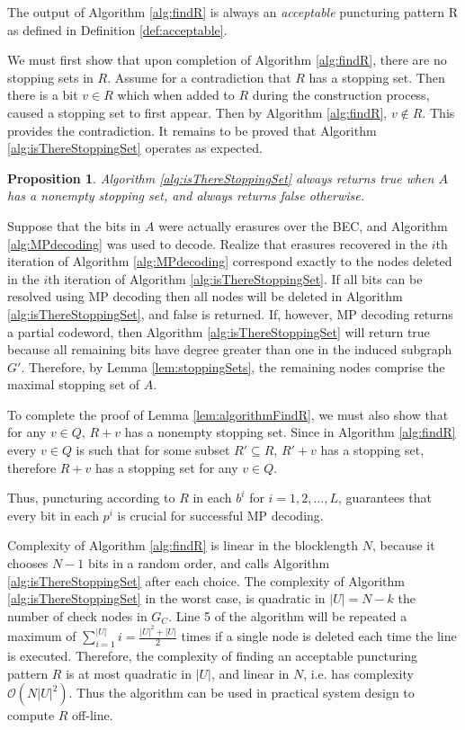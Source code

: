 \documentclass[10pt,twocolumn,twoside]{IEEEtran} \newlength{\pic}
\newtheorem{proposition}{Proposition}
\theoremstyle{definition}
\theoremstyle{remark}
\theoremstyle{plain}
\begin{document}
\begin{lemma}\label{lem:algorithmFindR}
 The output of Algorithm \ref{alg:findR} is always an \emph{acceptable} puncturing pattern R as defined in Definition \ref{def:acceptable}.
\end{lemma}
\begin{IEEEproof}
We must first show that upon completion of Algorithm \ref{alg:findR}, there are no stopping sets in $R$. Assume for a contradiction that $R$ has a stopping set. Then there is a bit $v\in R$ which when added to $R$ during the construction process, caused a stopping set to first appear. Then by Algorithm \ref{alg:findR}, $v\notin R$. This provides the contradiction. It remains to be proved that Algorithm \ref{alg:isThereStoppingSet} operates as expected.
\begin{proposition} \label{prop:algIsThereSSWorks}
 Algorithm \ref{alg:isThereStoppingSet} always returns true when $A$ has a nonempty stopping set, and always returns false otherwise.
\end{proposition}
\begin{IEEEproof} Suppose that the bits in $A$ were actually erasures over the BEC, and Algorithm \ref{alg:MPdecoding} was used to decode. Realize that erasures recovered in the $i$th iteration of Algorithm \ref{alg:MPdecoding} correspond exactly to the nodes deleted in the $i$th iteration of Algorithm \ref{alg:isThereStoppingSet}. If all bits can be resolved using MP decoding then all nodes will be deleted in Algorithm \ref{alg:isThereStoppingSet}, and false is returned. If, however, MP decoding returns a partial codeword, then Algorithm \ref{alg:isThereStoppingSet} will return true because all remaining bits have degree greater than one in the induced subgraph $G'$. Therefore, by Lemma \ref{lem:stoppingSets}, the remaining nodes comprise the maximal stopping set of $A$.
\end{IEEEproof}

To complete the proof of Lemma \ref{lem:algorithmFindR}, we must also show that for any $v\in Q$, $R+v$ has a nonempty stopping set. Since in Algorithm \ref{alg:findR} every $v\in Q$ is such that for some subset $R'\subseteq R$, $R'+v$ has a stopping set, therefore $R + v$ has a stopping set for any $v\in Q$.
\end{IEEEproof}
Thus, puncturing according to $R$ in each $b^i$ for $i = 1, 2, \ldots, L$, guarantees that every bit in each $p^i$ is crucial for successful MP decoding.

Complexity of Algorithm \ref{alg:findR} is linear in the blocklength $N$, because it chooses $N-1$ bits in a random order, and calls Algorithm \ref{alg:isThereStoppingSet} after each choice. The complexity of Algorithm \ref{alg:isThereStoppingSet} in the worst case, is quadratic in $|U|=N-k$ the number of check nodes in $G_C$. Line 5 of the algorithm will be repeated a maximum of $\sum_{i=1}^{|U|} i = \frac{|U|^2+|U|}{2}$ times if a single node is deleted each time the line is executed. Therefore, the complexity of finding an acceptable puncturing pattern $R$ is at most quadratic in $|U|$, and linear in $N$, i.e. has complexity $\mathcal{O}(N|U|^2)$. Thus the algorithm can be used in practical system design to compute $R$ off-line.
\end{document}
